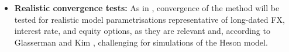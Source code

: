 \documentclass[12,twoside]{mammeTFM}
\theoremstyle{definition}
\theoremstyle{remark}
\begin{document}
\begin{itemize}


\item \textbf{Realistic convergence tests:}
As in \cite{cui17}, convergence of the method will be tested for realistic model parametrisations representative of long-dated FX, interest rate, and equity options, as they are relevant and, according to Glasserman and Kim \cite{gla11}, challenging for simulations of the Heson model.






\end{itemize}
\end{document}
